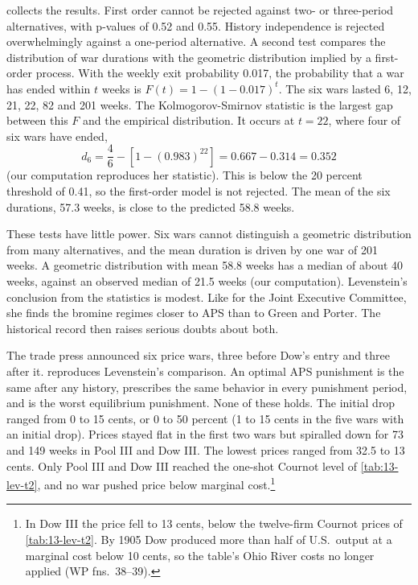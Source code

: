  collects the results. First order cannot be rejected against two- or three-period
alternatives, with p-values of 0.52 and 0.55. History independence is rejected overwhelmingly against a
one-period alternative. A second test compares the distribution of war durations with the geometric distribution
implied by a first-order process. With the weekly exit probability 0.017, the probability that a war has ended
within $t$ weeks is $F(t) = 1 - (1 - 0.017)^t$. The six wars lasted 6, 12, 21, 22, 82 and 201 weeks. The
Kolmogorov-Smirnov statistic is the largest gap between this $F$ and the empirical distribution. It occurs at
$t = 22$, where four of six wars have ended,
\begin{equation*}
  d_6 = \frac{4}{6} - \left[1 - (0.983)^{22}\right] = 0.667 - 0.314 = 0.352
\end{equation*}
(our computation reproduces her statistic). This is below the 20 percent threshold of 0.41, so the first-order
model is not rejected. The mean of the six durations, 57.3 weeks, is close to the predicted 58.8 weeks.

These tests have little power. Six wars cannot distinguish a geometric distribution from many alternatives, and
the mean duration is driven by one war of 201 weeks. A geometric distribution with mean 58.8 weeks has a median
of about 40 weeks, against an observed median of 21.5 weeks (our computation). Levenstein's conclusion from the
statistics is modest. Like \citet{BerryBriggs1988} for the Joint Executive Committee, she finds the bromine
regimes closer to APS than to Green and Porter. The historical record then raises serious doubts about both.

The trade press announced six price wars, three before Dow's entry and three after it. 
reproduces Levenstein's comparison. An optimal APS punishment is the same after any history, prescribes the same
behavior in every punishment period, and is the worst equilibrium punishment. None of these holds. The initial
drop ranged from 0 to 15 cents, or 0 to 50 percent (1 to 15 cents in the five wars with an initial drop). Prices stayed flat in the first two wars but spiralled down
for 73 and 149 weeks in Pool III and Dow III. The lowest prices ranged from 32.5 to 13 cents. Only Pool III and
Dow III reached the one-shot Cournot level of \cref{tab:13-lev-t2}, and no war pushed price below marginal
cost.\footnote{In Dow III the price fell to 13 cents, below the twelve-firm Cournot prices of
\cref{tab:13-lev-t2}. By 1905 Dow produced more than half of U.S.\ output at a marginal cost below 10 cents, so
the table's Ohio River costs no longer applied (WP fns.~38--39).}

